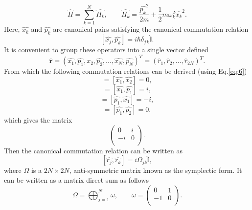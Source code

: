 \documentclass[11pt,a4paper,openbib]{article}
\numberwithin{equation}{section}
\begin{document}
\begin{equation} \label{eq:8}
\hat{H} = \sum_{k=1}^{N}\hat{H_k},\qquad\hat{H_k} =\frac{\hat{p_k}^2}{2m} + \frac{1}{2} m\omega_{k}^2\hat{x_k}^2.
\end{equation}
Here, $\hat{x_k}$ and $\hat{p_k}$ are canonical pairs satisfying the canonical commutation relation 
\begin{equation} \label{eq:9}
[\hat{x_j}, \hat{p_k}] = i\hbar \delta_{j\,k}\hat{\mathbb{I}} .
\end{equation}
It is convenient to group these operators into a single vector defined
\begin{equation} \label{eq:10}
\mathbf{\hat{r}} = (\hat{x_1},\hat{p_1},\hat{x_2},\hat{p_2},...,\hat{x_N},\hat{p_N})^T = (\hat{r}_1, \hat{r}_2, ..., \hat{r}_{2N})^T .
\end{equation}
From which the following commutation relations can be derived (using Eq.\ref{eq:6})
\begin{equation*}
[\hat{r}_1, \hat{r}_1] = [\hat{x_1}, \hat{x_2}] = 0,
\end{equation*} 
\begin{equation*}
[\hat{r}_1, \hat{r}_2] = [\hat{x_1}, \hat{p_1}] = i,
\end{equation*} 
\begin{equation*}
[\hat{r}_2, \hat{r}_1] = [\hat{p_1}, \hat{x_1}] = -i,
\end{equation*} 
\begin{equation*}
[\hat{r}_2, \hat{r}_2] = [\hat{p_1}, \hat{p_2}] = 0,
\end{equation*}
which gives the matrix 
\begin{equation*}
\begin{pmatrix}
0 & i  \\
-i & 0 \\
\end{pmatrix}.
\end{equation*}
Then the canonical commutation relation can be written as
\begin{equation} \label{eq:11}
[\hat{r_j}, \hat{r_k}] = i\Omega_{jk}\mathbb{\hat{I}},
\end{equation}
where $\Omega$ is a $2N \times 2N$, anti-symmetric matrix known as the symplectic form. It can be written as a matrix direct sum as follows
\begin{equation} \label{eq:12}
\Omega = \bigoplus_{j=1}^{N}\omega, \qquad\omega = 
\begin{pmatrix}
0 & 1  \\
-1 & 0 \\
\end{pmatrix}.
\end{equation}
\end{document}
